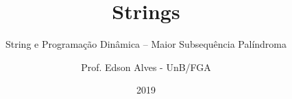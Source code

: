\title{Strings}
\subtitle{String e Programação Dinâmica -- Maior Subsequência Palíndroma}
\author{Prof. Edson Alves - UnB/FGA}
\date{2019}
